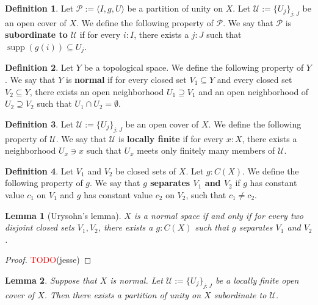 \documentclass[11pt]{article}
\newcommand{\remph}[1]{\textcolor{red}{#1}}
\newcommand{\TODO}{\remph{TODO}}
\theoremstyle{plain}
\newtheorem{lemma}{Lemma}[section]
\theoremstyle{definition}
\newtheorem{definition}{Definition}[section]
\newcommand{\supp}{\operatorname{supp}}
\begin{document}
\begin{definition}\label{def:subordinate}
  Let \(\mathscr{P} := \langle I, g, U \rangle\) be a partition of unity on \(X\). Let \(\mathscr{U} := \{U_j\}_{j : J}\) be an open cover of \(X\). We define the following property of \(\mathscr{P}\). We say that \(\mathscr{P}\) is \textbf{subordinate to} \(\mathscr{U}\) if for every \(i : I\), there exists a \(j : J\) such that \(\supp(g(i)) \subseteq U_j\).
\end{definition}

\begin{definition}\label{def:normal-space}
  Let \(Y\) be a topological space. We define the following property of \(Y\). We say that \(Y\) is \textbf{normal} if for every closed set \(V_1 \subseteq Y\) and every closed set \(V_2 \subseteq Y\), there exists an open neighborhood \(U_1 \supseteq V_1\) and an open neighborhood of \(U_2 \supseteq V_2\) such that \(U_1 \cap U_2 = \emptyset\).
\end{definition}

\begin{definition}\label{def:locally-finite-open-cover}
  Let \(\mathscr{U} := \{U_j\}_{j : J}\) be an open cover of \(X\). We define the following property of \(\mathscr{U}\). We say that \(\mathscr{U}\) is \textbf{locally finite} if for every \(x : X\), there exists a neighborhood \(U_x \ni x\) such that \(U_x\) meets only finitely many members of \(\mathscr{U}\).
\end{definition}

\begin{definition}\label{def:separated-by-function}
  Let \(V_1\) and \(V_2\) be closed sets of \(X\). Let \(g : C(X)\). We define the following property of \(g\). We say that \textbf{\(g\) separates \(V_1\) and \(V_2\)} if \(g\) has constant value \(c_1\) on \(V_1\) and \(g\) has constant value \(c_2\) on \(V_2\), such that \(c_1 \neq c_2\).
\end{definition}

\begin{lemma}[Urysohn's lemma]\label{lemma:urysohn}
  \(X\) is a normal space if and only if for every two disjoint closed sets \(V_1, V_2\), there exists a \(g : C(X)\) such that \(g\) separates \(V_1\) and \(V_2\).
\end{lemma}

\begin{proof}
  \TODO(jesse)
\end{proof}

\begin{lemma} \label{lemma:subordinate-partition-of-unity}
  Suppose that \(X\) is normal. Let \(\mathscr{U} := \{U_j\}_{j : J}\) be a locally finite open cover of \(X\). Then there exists a partition of unity on \(X\) subordinate to \(\mathscr{U}\).
\end{lemma}
\end{document}
